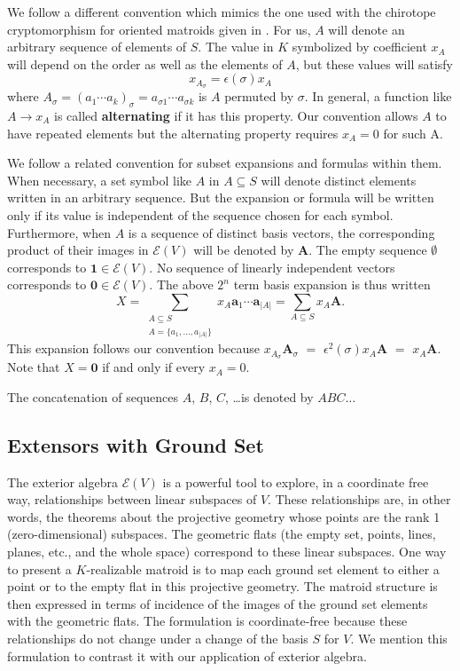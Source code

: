 \documentclass[12pt]{article}
\theoremstyle{definition}
\newcommand{\FieldK}{\ensuremath{K}}
\newcommand{\Card}[1]{\ensuremath{{\left|#1\right|}}}
\newcommand{\ext}[1]{\ensuremath{\mathbf{#1}}}
\begin{document}
We follow a different convention which mimics the one used with
the chirotope cryptomorphism for oriented matroids given in \cite{OMBOOK}.  
For us, $A$ will
denote an arbitrary sequence of elements of $S$.  The
value in $\FieldK$ symbolized by coefficient $x_A$ will depend on the order
as well as the elements of $A$, but these values will satisfy
\[
    x_{A_\sigma}=\epsilon(\sigma)x_A
\]
where $A_{\sigma}=(a_1\cdots a_k)_{\sigma}=a_{\sigma{1}}\cdots a_{\sigma{k}}$
is $A$ permuted by $\sigma$.
In general,
a function like $A\rightarrow x_A$ 
is called \textbf{alternating} if it has this property.
Our convention allows
$A$ to have repeated elements but the alternating property
requires $x_A=0$ for such A.  

We follow a related convention for subset expansions and formulas within them.
When necessary, a set symbol like $A$ in $A\subseteq S$ will denote
distinct elements written in an arbitrary sequence.  But the expansion
or formula will be written only if its value is independent of the sequence
chosen for each symbol.  Furthermore, when $A$ is a sequence of
distinct basis 
vectors, the corresponding product of their images in $\mathcal{E}(V)$
will be denoted by $\mathbf{A}$.  The empty sequence $\emptyset$ corresponds
to $\mathbf{1}\in\mathcal{E}(V)$.  No sequence of linearly independent
vectors corresponds to $\mathbf{0}\in\mathcal{E}(V)$.
The above $2^n$ term basis expansion is thus written 
\[
X = \sum_{\substack{A\subseteq S\\ A=\{a_1,\ldots,a_{\Card{A}}\}}}x_A\ext{a}_1\cdots \ext{a}_{\Card{A}}
  = \sum_{A\subseteq S}x_A\ext{A}.
\]
This expansion follows our convention because
$x_{A_\sigma}\mathbf{A}_\sigma$ $=$ $\epsilon^2(\sigma)x_A\mathbf{A}$ $=$ 
$x_A\mathbf{A}$.  
Note that $X=\mathbf{0}$ if and only if every $x_A=0$.

The concatenation of sequences $A$, $B$, $C$, \ldots is denoted by $ABC\ldots$

\subsection{Extensors with Ground Set}
\label{ExtWithGroundSetSect}

The exterior algebra $\mathcal{E}(V)$ 
is a powerful tool to explore, in a coordinate free way, relationships 
between linear subspaces of $V$\cite{RotaCayley,WhiteCayleyGeoAppl}.  
These relationships are, in other words, the
theorems about the projective geometry whose points are 
the rank 1 (zero-dimensional) subspaces.   The geometric flats 
(the empty set, points, lines, planes, etc., and the whole space) 
correspond to these linear subspaces.  One way to present
a $\FieldK$-realizable matroid is to map each ground set element
to either a point or to the empty flat in this projective geometry.  
The matroid structure is then expressed in terms of incidence of
the images of the ground set elements with the geometric flats.
The formulation is coordinate-free because these
relationships do not change under a change of the basis $S$ for $V$.
We mention this formulation 
to contrast it with our application of exterior algebra.
\end{document}
